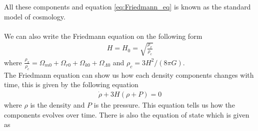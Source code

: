\documentclass{aa}
\begin{document}
All these components and equation \eqref{eq:Friedmann_eq} is known as the standard model of cosmology.\\   
\\
We can also write the Friedmann equation on the following form
\begin{align}
    H=H_0=\sqrt{\frac{\rho_x}{\rho_c}} \label{eq:H_rho}
\end{align}
where $\frac{\rho_x}{\rho_c}=\Omega_{m0}+\Omega_{r0}+\Omega_{k0}+\Omega_{\Lambda 0}$ and $\rho_c=3H^2/(8\pi G)$.\\
The Friedmann equation can show us how each density components changes with time, this is given by the following equation
\begin{align}
    \Dot{\rho}+3H(\rho+P)=0
\end{align}
where $\rho$ is the density and $P$ is the pressure. This equation tells us how the components evolves over time. There is also the equation of state which is given as
\end{document}
